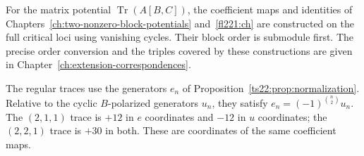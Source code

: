 For the matrix potential $\operatorname{Tr}(A[B,C])$, the coefficient maps
and identities of Chapters~\ref{ch:two-nonzero-block-potentials}
and~\ref{fl221:ch} are constructed on the full critical loci using
vanishing cycles. Their block order is submodule first. The precise order
conversion and the triples covered by these constructions are given in
Chapter~\ref{ch:extension-correspondences}.

The regular traces use the generators $e_n$ of
Proposition~\ref{ts22:prop:normalization}. Relative to the cyclic
$B$-polarized generators $u_n$, they satisfy
$e_n=(-1)^{\binom n2}u_n$. The $(2,1,1)$ trace is $+12$ in $e$
coordinates and $-12$ in $u$ coordinates; the $(2,2,1)$ trace is
$+30$ in both. These are coordinates of the same coefficient maps.

